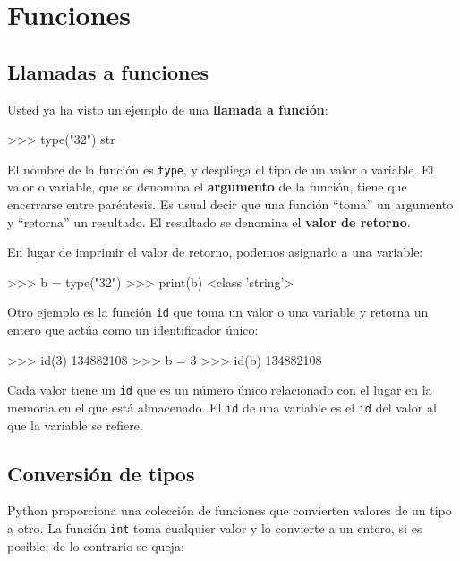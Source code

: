 
\chapter{Funciones }

\label{floatchap}

\section{Llamadas a funciones}

\label{functionchap}  

Usted ya ha visto un ejemplo de una \textbf{llamada a función}:

\begin{pyconcode}
>>> type("32")
str
\end{pyconcode}

El nombre de la función es \texttt{type}, y despliega el tipo de un
valor o variable. El valor o variable, que se denomina el \textbf{argumento}
de la función, tiene que encerrarse entre paréntesis. Es usual decir
que una función ``toma'' un argumento y ``retorna'' un resultado.
El resultado se denomina el \textbf{valor de retorno}.

 

En lugar de imprimir el valor de retorno, podemos asignarlo a una
variable:

\begin{pyconcode}
>>> b = type("32")
>>> print(b)
<class 'string'>
\end{pyconcode}
 

Otro ejemplo es la función \texttt{id} que toma un valor o una variable
y retorna un entero que actúa como un identificador único:

\begin{pyconcode}
>>> id(3)
134882108
>>> b = 3
>>> id(b)
134882108
\end{pyconcode}
 Cada valor tiene un \texttt{id} que es un número único relacionado
con el lugar en la memoria en el que está almacenado. El \texttt{id}
de una variable es el \texttt{id} del valor al que la variable se
refiere.

\section{Conversión de tipos}

 

Python proporciona una colección de funciones que convierten valores
de un tipo a otro. La función \texttt{int} toma cualquier valor y
lo convierte a un entero, si es posible, de lo contrario se queja:

